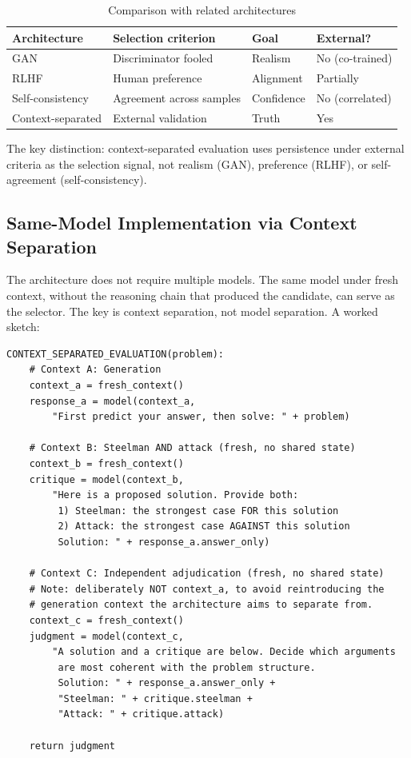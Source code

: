 \documentclass[11pt]{article}
\begin{document}
\begin{table}[h]
\centering
\caption{Comparison with related architectures}
\begin{tabular}{llll}
\toprule
\textbf{Architecture} & \textbf{Selection criterion} & \textbf{Goal} & \textbf{External?} \\
\midrule
GAN & Discriminator fooled & Realism & No (co-trained) \\
RLHF & Human preference & Alignment & Partially \\
Self-consistency & Agreement across samples & Confidence & No (correlated) \\
Context-separated & External validation & Truth & Yes \\
\bottomrule
\end{tabular}
\end{table}

The key distinction: context-separated evaluation uses persistence under external criteria as the selection signal, not realism (GAN), preference (RLHF), or self-agreement (self-consistency).

\subsection{Same-Model Implementation via Context Separation}

The architecture does not require multiple models. The same model under fresh context, without the reasoning chain that produced the candidate, can serve as the selector. The key is context separation, not model separation. A worked sketch:

\begin{verbatim}
CONTEXT_SEPARATED_EVALUATION(problem):
    # Context A: Generation
    context_a = fresh_context()
    response_a = model(context_a,
        "First predict your answer, then solve: " + problem)

    # Context B: Steelman AND attack (fresh, no shared state)
    context_b = fresh_context()
    critique = model(context_b,
        "Here is a proposed solution. Provide both:
         1) Steelman: the strongest case FOR this solution
         2) Attack: the strongest case AGAINST this solution
         Solution: " + response_a.answer_only)

    # Context C: Independent adjudication (fresh, no shared state)
    # Note: deliberately NOT context_a, to avoid reintroducing the
    # generation context the architecture aims to separate from.
    context_c = fresh_context()
    judgment = model(context_c,
        "A solution and a critique are below. Decide which arguments
         are most coherent with the problem structure.
         Solution: " + response_a.answer_only +
         "Steelman: " + critique.steelman +
         "Attack: " + critique.attack)

    return judgment
\end{verbatim}
\end{document}
